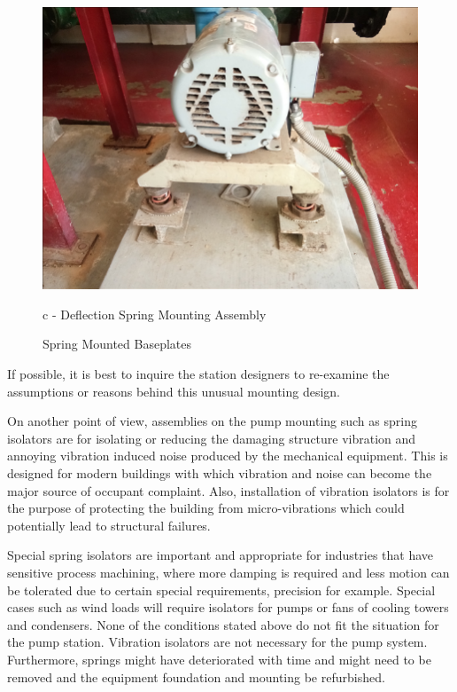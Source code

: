 \begin{figure}[!htb]
\begin{minipage}[b]{0.3\linewidth}
		\includegraphics[width=\textwidth]{figures/fig_ch043_pump_vibisolator2}
		\caption*{c - Deflection Spring Mounting Assembly}
	\end{minipage}
	\caption{Spring Mounted Baseplates}
	\label{fig_ch043_spring_mounted_baseplates}
\end{figure}

If possible, it is best to inquire the station designers to re-examine the assumptions or reasons behind this unusual mounting design.

On another point of view, assemblies on the pump mounting such as spring isolators are for isolating or reducing the damaging structure vibration and annoying vibration induced noise produced by the mechanical equipment. This is designed for modern buildings with which vibration and noise can become the major source of occupant complaint. Also, installation of vibration isolators is for the purpose of protecting the building from micro-vibrations which could potentially lead to structural failures.

Special spring isolators are important and appropriate for industries that have sensitive process machining, where more damping is required and less motion can be tolerated due to certain special requirements, precision for example. Special cases such as wind loads will require isolators for pumps or fans of cooling towers and condensers. None of the conditions stated above do not fit the situation for the pump station. Vibration isolators are not necessary for the pump system. Furthermore, springs might have deteriorated with time and might need to be removed and the equipment foundation and mounting be refurbished. 

